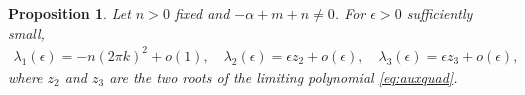 \documentclass[a4paper,11pt]{article}
\newtheorem{proposition}{Proposition}[section]
\theoremstyle{remark}
\begin{document}
\begin{proposition}
Let $n>0$ fixed and $-\alpha+m+n\ne0$. For $\epsilon>0$ sufficiently small,
\begin{equation}
\begin{aligned}
 \lambda_1(\epsilon) = -n(2\pi k)^2 + {o}(1), \quad
 \lambda_2(\epsilon) = \epsilon z_2 + {o}(\epsilon), \quad
 \lambda_3(\epsilon) = \epsilon z_3 + {o}(\epsilon),
\end{aligned} \label{eq:roots}
\end{equation}
where $z_2$ and $z_3$ are the two roots of the limiting polynomial \eqref{eq:auxquad}.
\end{proposition}
\end{document}
